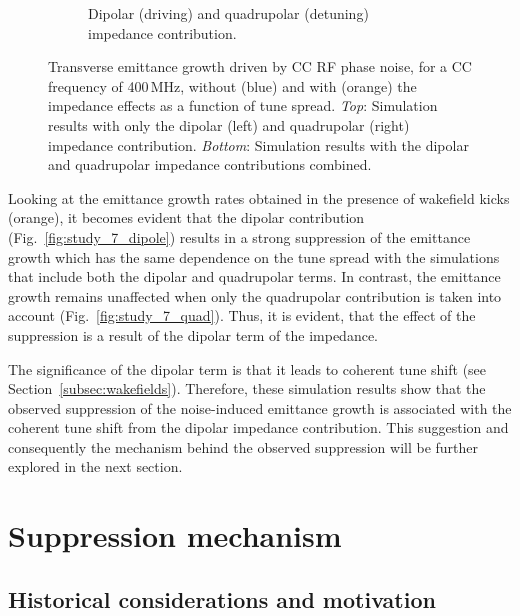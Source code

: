 \begin{figure}[htp]
\begin{subfigure}{.45\textwidth}
        \caption{Dipolar (driving) and quadrupolar (detuning) impedance contribution.}
        \label{fig:study_7_dipole_and_quad}
    \end{subfigure}   
    \caption{Transverse emittance growth driven by CC RF phase noise, for a CC frequency of 400\,MHz, without (blue) and with (orange) the impedance effects as a function of tune spread. \textit{Top}: Simulation results with only the dipolar (left) and quadrupolar (right) impedance contribution. \textit{Bottom}: Simulation results with the dipolar and quadrupolar impedance contributions combined.}
    \label{fig:study_7_dipole_vs_quadrupole}
\end{figure}

Looking at the emittance growth rates obtained in the presence of wakefield kicks (orange), it becomes evident that the dipolar contribution (Fig.~\ref{fig:study_7_dipole}) results in a strong suppression of the emittance growth which has the same dependence on the tune spread with the simulations that include both the dipolar and quadrupolar terms. In contrast, the emittance growth remains unaffected when only the quadrupolar contribution is taken into account (Fig.~\ref{fig:study_7_quad}). Thus, it is evident, that the effect of the suppression is a result of the dipolar term of the impedance. 

The significance of the dipolar term is that it leads to coherent tune shift (see Section~\ref{subsec:wakefields}). Therefore, these simulation results show that the observed suppression of the noise-induced emittance growth is associated with the coherent tune shift from the dipolar impedance contribution. This suggestion and consequently the mechanism behind the observed suppression will be further explored in the next section.


\section{Suppression mechanism}\label{sec:suppression_mechanism}


\subsection{Historical considerations and motivation}\label{subsec:past_studies_impedance_suppression_BB}

